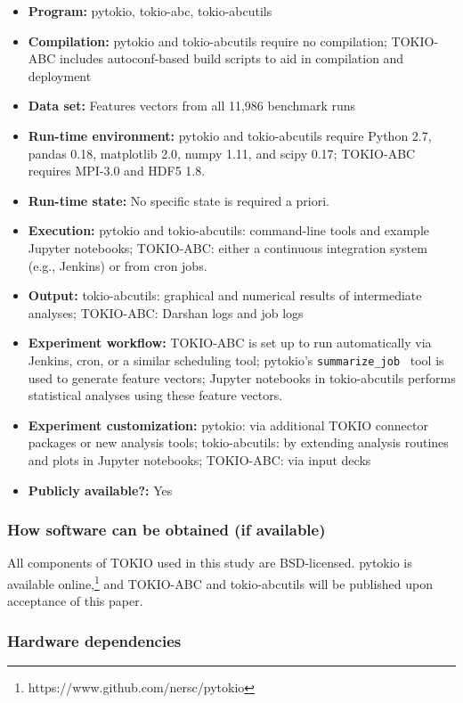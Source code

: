 {\small
\begin{itemize}
  \item {\bf Program: } pytokio, tokio-abc, tokio-abcutils
  \item {\bf Compilation: } pytokio and tokio-abcutils require no compilation; TOKIO-ABC includes autoconf-based build scripts to aid in compilation and deployment
  \item {\bf Data set:} Features vectors from all 11,986 benchmark runs
  \item {\bf Run-time environment: } pytokio and tokio-abcutils require Python 2.7, pandas 0.18, matplotlib 2.0, numpy 1.11, and scipy 0.17; TOKIO-ABC requires MPI-3.0 and HDF5 1.8.
  \item {\bf Run-time state: } No specific state is required a priori.
  \item {\bf Execution: } pytokio and tokio-abcutils: command-line tools and example Jupyter notebooks; TOKIO-ABC: either a continuous integration system (e.g., Jenkins) or from cron jobs.
  \item {\bf Output: } tokio-abcutils: graphical and numerical results of intermediate analyses; TOKIO-ABC: Darshan logs and job logs
  \item {\bf Experiment workflow: } TOKIO-ABC is set up to run automatically via Jenkins, cron, or a similar scheduling tool; pytokio's \texttt{summarize\_job}~\cite{Lockwood2018tokio} tool is used to generate feature vectors; Jupyter notebooks in tokio-abcutils performs statistical analyses using these feature vectors.
  \item {\bf Experiment customization: } pytokio: via additional TOKIO connector packages or new analysis tools; tokio-abcutils: by extending analysis routines and plots in Jupyter notebooks; TOKIO-ABC: via input decks
  \item {\bf Publicly available?: } Yes
\end{itemize}
}

\subsubsection{How software can be obtained (if available)}

All components of TOKIO used in this study are BSD-licensed.
pytokio is available online,\footnote{https://www.github.com/nersc/pytokio} and TOKIO-ABC and tokio-abcutils will be published upon acceptance of this paper.

\subsubsection{Hardware dependencies}

